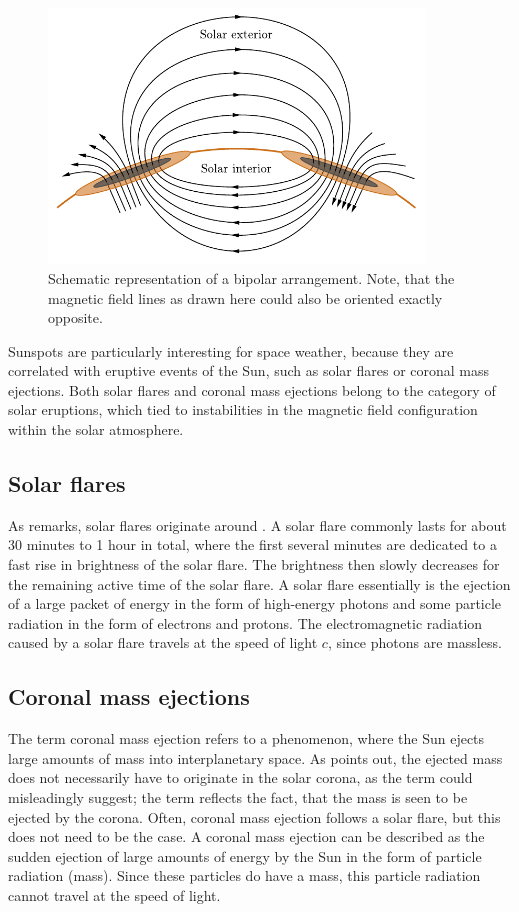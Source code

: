 \documentclass[a4paper,11pt]{report}
\def\fc#1{{\color{black}{#1}}} %
\def\lk#1{{\color{black}{#1}}}
\begin{document}
\begin{figure}[h]
\centering
\includegraphics[width=10cm]{figures/bipolarSunspots.pdf}
\caption{Schematic representation of a bipolar \lk{sunspot} arrangement. Note, that the magnetic field lines as drawn here could also be oriented exactly opposite.}
\label{fig:bipolarSunspots}
\end{figure}
Sunspots are particularly interesting for space weather, because they are correlated with eruptive events of the Sun, such as solar flares or coronal mass ejections. Both solar flares and coronal mass ejections belong to the category of solar eruptions, which \fc{are} tied to instabilities in the magnetic field configuration within the solar atmosphere.

\subsection{Solar flares}
As \cite[p.432]{Stix.2002} remarks, solar flares \lk{mostly} originate around \lk{sun-spots}. A solar flare commonly lasts for about 30 minutes to 1 hour in total, where the first several minutes are dedicated to a fast rise in brightness of the solar flare. The brightness then slowly decreases for the remaining active time of the solar flare. A solar flare essentially is the ejection of a large packet of energy in the form of high-energy photons and some particle radiation in the form of electrons and protons. The electromagnetic radiation caused by a solar flare travels at the speed of light $c$, since photons are massless.

\subsection{Coronal mass ejections}
The term coronal mass ejection refers to a phenomenon, where the Sun ejects large amounts of mass into interplanetary space. As \cite[p.436]{Stix.2002} points out, the ejected mass does not necessarily have to originate in the solar corona, as the term could misleadingly suggest; the term reflects the fact, that the mass is seen to be ejected by the corona. Often, \lk{a} coronal mass ejection follows a solar flare, but this does not need to be the case. A coronal mass ejection can be described as the sudden ejection of large amounts of energy by the Sun in the form of particle radiation (mass). Since these particles do have a mass, this particle radiation cannot travel at the speed of light.
\end{document}
